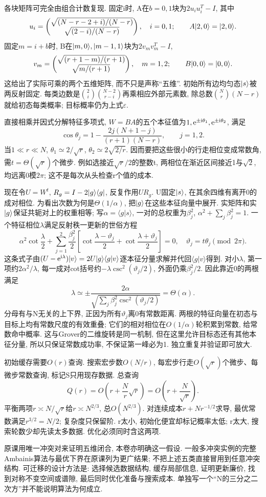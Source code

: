 各块矩阵可完全由组合计数复现. 固定i时, A在$b=0,1$块为$2u_i u_i^T-I$, 其中
\[u_i=\begin{pmatrix}\sqrt{(N-r-2+i)/(N-r)}\\\sqrt{(2-i)/(N-r)}\end{pmatrix},\quad i=0,1;
\qquad A\lvert 2,0\rangle=\lvert 2,0\rangle.\]
固定$m=i+b$时, B在$\lvert m,0\rangle,\lvert m-1,1\rangle$块为$2v_mv_m^T-I$,
\[v_m=\begin{pmatrix}\sqrt{(r+1-m)/(r+1)}\\\sqrt{m/(r+1)}\end{pmatrix},\quad m=1,2;
\qquad B\lvert 0,0\rangle=\lvert 0,0\rangle.\]
这给出了实际可乘的两个五维矩阵, 而不只是声称“五维”. 初始所有边均匀态$\lvert s\rangle$被两反射固定. 每类边数是$\binom2i\binom{N-2}{r-i}$再乘相应外部元素数, 除总数$\binom Nr(N-r)$就给初态每类概率; 目标概率仍为上式$\varepsilon$.

直接相乘并因式分解特征多项式, $W=BA$的五个本征值为$1,\mathrm e^{\pm\mathrm i\theta_1},\mathrm e^{\pm\mathrm i\theta_2}$, 满足
\[\cos\theta_j=1-\frac{2j(N+1-j)}{(r+1)(N-r)},\qquad j=1,2.\]
当$1\ll r\ll N$, $\theta_1\simeq2/\sqrt r$, $\theta_2\simeq2\sqrt{2/r}$. 因而要把这些很小的行走相位变成常数角, 需$t=\Theta(\sqrt r)$个微步. 例如选接近$\sqrt r/2$的整数t, 两相位在渐近区间接近1与$\sqrt2$, 均远离0模$2\pi$; 这不是每次从头检查r个值的成本.

现在令$U=W^t$, $R_g=I-2\lvert g\rangle\langle g\rvert$, 反复作用$UR_g$. U固定$\lvert s\rangle$, 在其余四维有离开0的成对相位. 为看出次数为何是$\Theta(1/\alpha)$, 把$\lvert g\rangle$在这些本征向量中展开. 实矩阵和实$\lvert g\rangle$保证共轭对上的权重相等; 写$\alpha=\langle g|s\rangle$, 一对的总权重为$\beta_j^2$, $\alpha^2+\sum_j\beta_j^2=1$. 一个特征相位$\lambda$满足反射秩一更新的世俗方程
\[\alpha^2\cot\frac\lambda2+
\sum_{j=1}^2\frac{\beta_j^2}2
\left[\cot\frac{\lambda-\vartheta_j}2+\cot\frac{\lambda+\vartheta_j}2\right]=0,
\quad\vartheta_j=t\theta_j\pmod{2\pi}.\]
这条式子由$(U-\mathrm e^{\mathrm i\lambda})\lvert v\rangle=2U\lvert g\rangle\langle g|v\rangle$逐本征分量求解并代回$\langle g|v\rangle$得到. 对小$\lambda$, 第一项约$2\alpha^2/\lambda$, 每一成对cot括号约$-\lambda\csc^2(\vartheta_j/2)$, 外面仍乘$\beta_j^2/2$. 因此靠近0的两根满足
\[\lambda\simeq\pm\frac{2\alpha}{\sqrt{\sum_j\beta_j^2\csc^2(\vartheta_j/2)}}=\Theta(\alpha).\]
分母有与N无关的上下界, 正因为所有$\vartheta_j$离0有常数距离. 两根的特征向量在初态与目标上均有常数尺度的有效重叠; 它们的相对相位在$O(1/\alpha)$轮积累到常数, 给常数命中概率. 这与Grover的二维旋转是同一机制, 但在这里允许目标态还有其他本征分量, 所以只保证常数成功率, 不保证第一峰必为1. 独立重复并验证即可放大.

初始缓存需要$O(r)$查询. 搜索宏步数$O(N/r)$, 每宏步行走$O(\sqrt r)$个微步、每微步常数查询, 标记S只用现存数据. 总查询
\[Q(r)=O\left(r+\frac Nr\sqrt r\right)=O\left(r+\frac N{\sqrt r}\right).\]
平衡两项$r\asymp N/\sqrt r$给$r\asymp N^{2/3}$, 总$O(N^{2/3})$. 对连续成本$r+N r^{-1/2}$求导, 最优常数满足$r^{3/2}=N/2$; 复杂度只保留阶. r太小, 初始化便宜却标记概率太低; r太大, 搜索轮数少却先读太多数据. 优化必须同时含这两项.

原课用唯一冲突对来证明五维闭合, 本卷亦明确这一假设. 一般多冲突实例的完整Ambainis算法与最优下界在原课列为更广结果; 不把上述五类直接冒用到任意冲突结构. 可迁移的设计方法是: 选择候选数据结构, 缓存局部信息, 证明更新廉价, 找到对称不变空间或谱隙, 最后同时优化准备与搜索成本. 单独写一个“N的三分之二次方”并不能说明算法为何成立.
